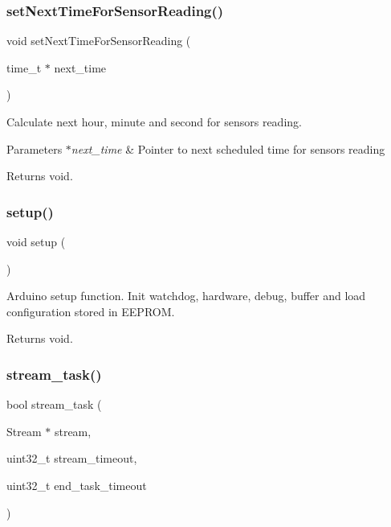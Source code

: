 \subsubsection{\texorpdfstring{set\+Next\+Time\+For\+Sensor\+Reading()}{setNextTimeForSensorReading()}}
{\footnotesize\ttfamily void set\+Next\+Time\+For\+Sensor\+Reading (\begin{DoxyParamCaption}\item[{time\+\_\+t $\ast$}]{next\+\_\+time }\end{DoxyParamCaption})}



Calculate next hour, minute and second for sensors reading. 


\begin{DoxyParams}{Parameters}
{\em $\ast$next\+\_\+time} & Pointer to next scheduled time for sensors reading \\
\hline
\end{DoxyParams}
\begin{DoxyReturn}{Returns}
void. 
\end{DoxyReturn}
\mbox{\label{rmap_8ino_a4fc01d736fe50cf5b977f755b675f11d}} 
\subsubsection{\texorpdfstring{setup()}{setup()}}
{\footnotesize\ttfamily void setup (\begin{DoxyParamCaption}{ }\end{DoxyParamCaption})}



Arduino setup function. Init watchdog, hardware, debug, buffer and load configuration stored in E\+E\+P\+R\+OM. 

\begin{DoxyReturn}{Returns}
void. 
\end{DoxyReturn}
\mbox{\label{rmap_8ino_a21575354e8ec54fa31f581ed1838be79}} 
\subsubsection{\texorpdfstring{stream\+\_\+task()}{stream\_task()}}
{\footnotesize\ttfamily bool stream\+\_\+task (\begin{DoxyParamCaption}\item[{Stream $\ast$}]{stream,  }\item[{uint32\+\_\+t}]{stream\+\_\+timeout,  }\item[{uint32\+\_\+t}]{end\+\_\+task\+\_\+timeout }\end{DoxyParamCaption})}



